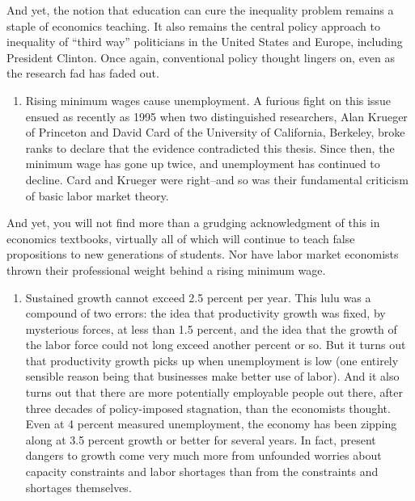 \documentclass[
]{book}
\providecommand{\tightlist}{%
  \setlength{\itemsep}{0pt}\setlength{\parskip}{0pt}}
\begin{document}
And yet, the notion that education can cure the inequality problem remains a staple of economics teaching. It also remains the central policy approach to inequality of ``third way'' politicians in the United States and Europe, including President Clinton. Once again, conventional policy thought lingers on, even as the research fad has faded out.

\begin{enumerate}
\def\labelenumi{\arabic{enumi}.}
\setcounter{enumi}{3}
\tightlist
\item
  Rising minimum wages cause unemployment. A furious fight on this issue ensued as recently as 1995 when two distinguished researchers, Alan Krueger of Princeton and David Card of the University of California, Berkeley, broke ranks to declare that the evidence contradicted this thesis. Since then, the minimum wage has gone up twice, and unemployment has continued to decline. Card and Krueger were right--and so was their fundamental criticism of basic labor market theory.
\end{enumerate}

And yet, you will not find more than a grudging acknowledgment of this in economics textbooks, virtually all of which will continue to teach false propositions to new generations of students. Nor have labor market economists thrown their professional weight behind a rising minimum wage.

\begin{enumerate}
\def\labelenumi{\arabic{enumi}.}
\setcounter{enumi}{4}
\tightlist
\item
  Sustained growth cannot exceed 2.5 percent per year. This lulu was a compound of two errors: the idea that productivity growth was fixed, by mysterious forces, at less than 1.5 percent, and the idea that the growth of the labor force could not long exceed another percent or so. But it turns out that productivity growth picks up when unemployment is low (one entirely sensible reason being that businesses make better use of labor). And it also turns out that there are more potentially employable people out there, after three decades of policy-imposed stagnation, than the economists thought. Even at 4 percent measured unemployment, the economy has been zipping along at 3.5 percent growth or better for several years. In fact, present dangers to growth come very much more from unfounded worries about capacity constraints and labor shortages than from the constraints and shortages themselves.
\end{enumerate}
\end{document}
